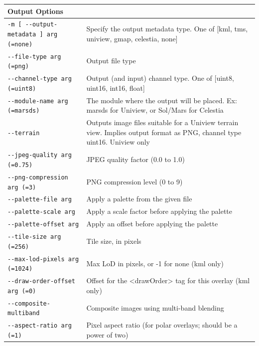 \begin{longtable}{|l|p{7.5cm}|}
Output Options\\ \hline
\verb#-m [ --output-metadata ] arg (=none)# & Specify the output metadata type. One of [kml, tms, uniview, gmap, celestia, none]\\ \hline
\verb#--file-type arg (=png)# & Output file type\\ \hline
\verb#--channel-type arg (=uint8)# & Output (and input) channel type. One of [uint8, uint16, int16, float]\\ \hline
\verb#--module-name arg (=marsds)# & The module where the output will be placed. Ex: marsds for Uniview, or Sol/Mars for Celestia\\ \hline
\verb#--terrain# & Outputs image files suitable for a Uniview terrain view. Implies output format as PNG, channel type uint16. Uniview only\\ \hline
\verb#--jpeg-quality arg (=0.75)# & JPEG quality factor (0.0 to 1.0)\\ \hline
\verb#--png-compression arg (=3)# & PNG compression level (0 to 9)\\ \hline
\verb#--palette-file arg# & Apply a palette from the given file\\ \hline
\verb#--palette-scale arg# & Apply a scale factor before applying the palette\\ \hline
\verb#--palette-offset arg# & Apply an offset before applying the palette\\ \hline
\verb#--tile-size arg (=256)# & Tile size, in pixels\\ \hline
\verb#--max-lod-pixels arg (=1024)# & Max LoD in pixels, or -1 for none (kml only)\\ \hline
\verb#--draw-order-offset arg (=0)# & Offset for the <drawOrder> tag for this overlay (kml only)\\ \hline
\verb#--composite-multiband # & Composite images using multi-band blending\\ \hline
\verb#--aspect-ratio arg (=1)# & Pixel aspect ratio (for polar overlays; should be a power of two)\\ \hline


\end{longtable}
